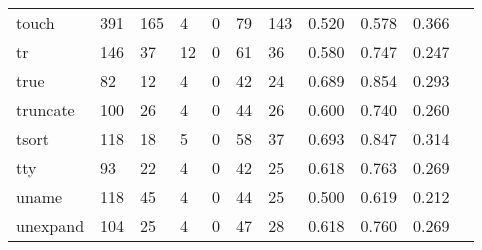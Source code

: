 \begin{longtable}{lp{1.10cm}p{1.10cm}p{1.10cm}p{1.10cm}p{1.10cm}p{1.10cm}p{1.10cm}p{1.10cm}p{1.10cm}p{1.10cm}}
touch     &                    391 &                                165 &                                 4 &                                0 &                                79 &                             143 &                          0.520 &                                 0.578 &                               0.366 \\
tr        &                    146 &                                 37 &                                12 &                                0 &                                61 &                              36 &                          0.580 &                                 0.747 &                               0.247 \\
true      &                     82 &                                 12 &                                 4 &                                0 &                                42 &                              24 &                          0.689 &                                 0.854 &                               0.293 \\
truncate  &                    100 &                                 26 &                                 4 &                                0 &                                44 &                              26 &                          0.600 &                                 0.740 &                               0.260 \\
tsort     &                    118 &                                 18 &                                 5 &                                0 &                                58 &                              37 &                          0.693 &                                 0.847 &                               0.314 \\
tty       &                     93 &                                 22 &                                 4 &                                0 &                                42 &                              25 &                          0.618 &                                 0.763 &                               0.269 \\
uname     &                    118 &                                 45 &                                 4 &                                0 &                                44 &                              25 &                          0.500 &                                 0.619 &                               0.212 \\
unexpand  &                    104 &                                 25 &                                 4 &                                0 &                                47 &                              28 &                          0.618 &                                 0.760 &                               0.269 \\

\end{longtable}
